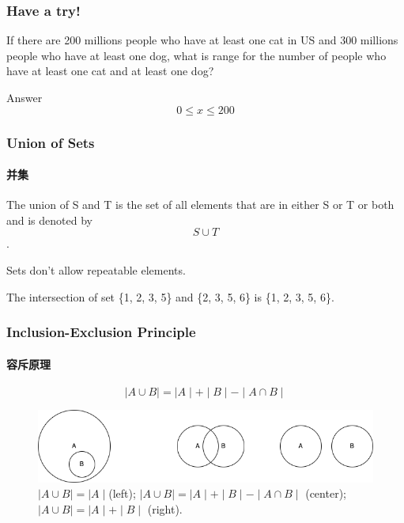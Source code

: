 \documentclass[
	11pt, %
]{beamer}
\begin{document}

\begin{frame}
	\frametitle{Have a try!}
If there are 200 millions people who have at least one cat in US and 300 millions people who have at least one dog, what is range for the number of people who have at least one cat \alert{and} at least one dog?


\pause
\bigskip\bigskip\bigskip\bigskip
Answer \textbf{$$0 \leq x \leq 200$$}
\end{frame}



\begin{frame}
	\frametitle{Union of Sets} %
	\framesubtitle{并集}
	\begin{definition}
The \alert{union} of S and T is the set of all elements that are
in either S or T or both and is denoted by $$S\cup	T$$.
	\end{definition}

	\alert{Sets don't allow repeatable elements.}
	\begin{example}
		The intersection of set \{1, 2, 3, 5\} and \{2, 3, 5, 6\} is \{1, 2, 3, 5, 6\}.
	\end{example}	
\end{frame}


\begin{frame}
	\frametitle{Inclusion-Exclusion Principle} %
	\framesubtitle{容斥原理}
	\begin{theorem}
	\begin{equation}
		\mid A \cup B \mid = \mid A \mid + \mid B \mid - \mid A \cap B \mid 
	\end{equation}
	\end{theorem}

	\begin{figure}
		\includegraphics[width=\linewidth]{Disjoint.png}
		\caption{
			$\mid A \cup B \mid = \mid A \mid $(left); $\mid A \cup B \mid = \mid A \mid + \mid B \mid - \mid A \cap B \mid $ (center); $\mid A \cup B \mid = \mid A \mid + \mid B \mid$ (right).}
	\end{figure}

\end{frame}
\end{document}
